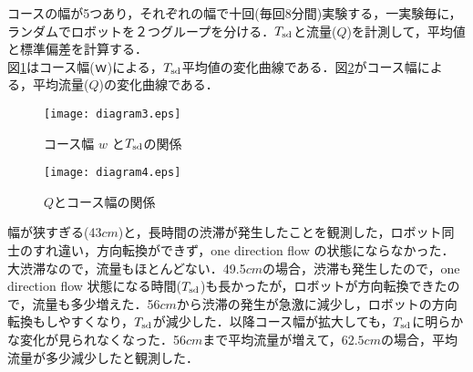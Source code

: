 コースの幅が5つあり，それぞれの幅で十回(毎回8分間)実験する，一実験毎に，ランダムでロボットを２つグループを分ける．$T_{\rm sd}$と流量($Q$)を計測して，平均値と標準偏差を計算する．\\
図\ref{dia1}はコース幅($ｗ$)による，$T_{\rm sd}$平均値の変化曲線である．図\ref{dia2}がコース幅による，平均流量($Q$)の変化曲線である．

\vspace{-4mm}
\begin{figure}[!ht]
    \centering
    \texttt{[image: diagram3.eps]}
    \caption{コース幅 $w$ と$T_{\rm sd}$の関係}
    \label{dia1}
\end{figure}

\begin{figure}[!ht]
    \centering
    \texttt{[image: diagram4.eps]}
    \caption{$Q$とコース幅の関係}
    \label{dia2}
\end{figure}

幅が狭すぎる(43$cm$)と，長時間の渋滞が発生したことを観測した，ロボット同士のすれ違い，方向転換ができず，one direction flow の状態にならなかった．大渋滞なので，流量もほとんどない．49.5$cm$の場合，渋滞も発生したので，one direction flow 状態になる時間($T_{\rm sd}$)も長かったが，ロボットが方向転換できたので，流量も多少増えた．56$cm$から渋滞の発生が急激に減少し，ロボットの方向転換もしやすくなり，$T_{\rm sd}$が減少した．以降コース幅が拡大しても，$T_{\rm sd}$に明らかな変化が見られなくなった．56$cm$まで平均流量が増えて，$62.5cm$の場合，平均流量が多少減少したと観測した．

